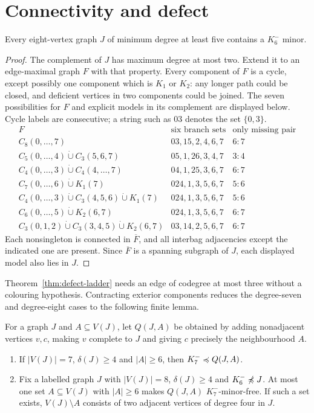 \section{Connectivity and defect}\label{sec:defect}

\begin{lemma}\label{lem:eight-complement}
Every eight-vertex graph $J$ of minimum degree at least five contains a
$K_6^{-}$ minor.
\end{lemma}

\begin{proof}
The complement of $J$ has maximum degree at most two.  Extend it to an
edge-maximal graph $F$ with that property.  Every component of $F$ is a
cycle, except possibly one component which is $K_1$ or $K_2$: any longer
path could be closed, and deficient vertices in two components could be
joined.  The seven possibilities for $F$ and explicit models in its
complement are displayed below.  Cycle labels are consecutive; a string
such as $03$ denotes the set $\{0,3\}$.
\[
\begin{array}{c|c|c}
F&\text{six branch sets}&\text{only missing pair}\\\hline
C_8(0,\ldots,7)&03,15,2,4,6,7&6:7\\
C_5(0,\ldots,4)\dot\cup C_3(5,6,7)&05,1,26,3,4,7&3:4\\
C_4(0,\ldots,3)\dot\cup C_4(4,\ldots,7)&04,1,25,3,6,7&6:7\\
C_7(0,\ldots,6)\dot\cup K_1(7)&024,1,3,5,6,7&5:6\\
C_4(0,\ldots,3)\dot\cup C_3(4,5,6)\dot\cup K_1(7)
 &024,1,3,5,6,7&5:6\\
C_6(0,\ldots,5)\dot\cup K_2(6,7)&024,1,3,5,6,7&6:7\\
C_3(0,1,2)\dot\cup C_3(3,4,5)\dot\cup K_2(6,7)
 &03,14,2,5,6,7&6:7
\end{array}
\]
Each nonsingleton is connected in $\overline F$, and all interbag
adjacencies except the indicated one are present.  Since $\overline F$
is a spanning subgraph of $J$, each displayed model also lies in $J$.
\end{proof}

Theorem~\ref{thm:defect-ladder} needs an edge of codegree at most three
without a colouring hypothesis.  Contracting exterior components reduces
the degree-seven and degree-eight cases to the following finite lemma.

\begin{lemma}\label{lem:finite-quotients}
For a graph $J$ and $A\subseteq V(J)$, let $Q(J,A)$ be obtained by adding
nonadjacent vertices $v,c$, making $v$ complete to $J$ and giving $c$
precisely the neighbourhood $A$.
\begin{enumerate}
\item If $|V(J)|=7$, $\delta(J)\geq4$ and $|A|\geq6$, then
$K_7^{-}\preccurlyeq Q(J,A)$.
\item Fix a labelled graph $J$ with $|V(J)|=8$, $\delta(J)\geq4$ and
$K_6^{-}\not\preccurlyeq J$.  At most one set $A\subseteq V(J)$ with $|A|\geq6$
makes $Q(J,A)$ $K_7^{-}$-minor-free.  If such a set exists,
$V(J)\setminus A$ consists of two adjacent vertices of degree four in $J$.
\end{enumerate}
\end{lemma}


